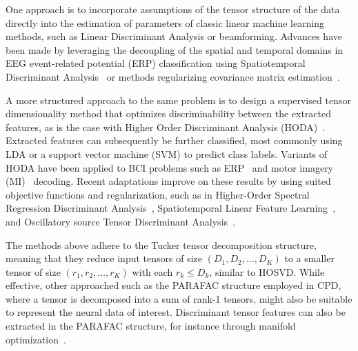 \documentclass[twocolumn]{article}
\begin{document}
One approach is to incorporate assumptions of the tensor structure of the data
directly into the estimation of parameters of classic linear machine learning
methods, such as Linear Discriminant Analysis or beamforming.
Advances have been made by leveraging the decoupling of the spatial and temporal
domains in EEG event-related potential (ERP) classification using Spatiotemporal
Discriminant Analysis~\cite{Li2010,Zhang2013} or methods regularizing covariance
matrix estimation~\cite{Kerchove2022,Sosulski2022}.

A more structured approach to the same problem is to design a supervised
tensor dimensionality method that optimizes discriminability between the
extracted features, as is the case with Higher Order Discriminant
Analysis (\textsc{HODA})~\cite{Yan2005,Phan2010,Froelich2018}.
Extracted features can subsequently be further classified, most commonly
using LDA or a support vector machine (SVM) to predict class labels.
Variants of \textsc{HODA} have been applied to BCI problems such as
ERP~\cite{Onishi2012,Higashi2016} and motor imagery (MI)~\cite{Liu2015,Cai2021}
decoding.
Recent adaptations improve on these results by using suited objective
functions and regularization, such as in Higher-Order Spectral Regression
Discriminant Analysis~\cite{Jamshidi2017}, Spatiotemporal Linear
Feature Learning~\cite{Aghili2023}, and Oscillatory source Tensor Discriminant
Analysis~\cite{Jorajuria2022}.

The methods above adhere to the Tucker tensor decomposition
structure, meaning that they reduce input tensors of size
$(D_1,D_2,\ldots,D_K)$ to a smaller tensor of size $(r_1,r_2,\ldots,r_K)$ with
each $r_k\leq D_k$, similar to \textsc{HOSVD}.
While effective, other approached such as the \textsc{PARAFAC} structure employed in
\textsc{CPD}, where a tensor is decomposed into a sum of rank-1 tensors,
might also be suitable to represent the neural data of interest.
Discriminant tensor features can also be extracted
in the \textsc{PARAFAC} structure, for instance through manifold
optimization~\cite{Froelich2018}.
\end{document}
